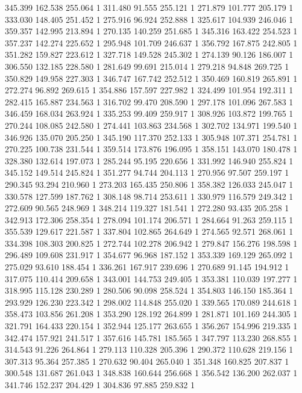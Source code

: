 	345.399	162.538	255.064	1
	311.480	91.555	255.121	1
	271.879	101.777	205.179	1
	333.030	148.405	251.452	1
	275.916	96.924	252.888	1
	325.617	104.939	246.046	1
	359.357	142.995	213.894	1
	270.135	140.259	251.685	1
	345.316	163.422	254.523	1
	357.237	142.274	225.652	1
	295.948	101.709	246.637	1
	356.792	167.875	242.805	1
	351.282	159.827	223.612	1
	327.718	149.528	245.302	1
	274.139	90.126	186.007	1
	306.550	132.185	228.580	1
	281.649	99.691	215.014	1
	279.218	94.848	269.725	1
	350.829	149.958	227.303	1
	346.747	167.742	252.512	1
	350.469	160.819	265.891	1
	272.274	96.892	269.615	1
	354.886	157.597	227.982	1
	324.499	101.954	192.311	1
	282.415	165.887	234.563	1
	316.702	99.470	208.590	1
	297.178	101.096	267.583	1
	346.459	168.034	263.924	1
	335.253	99.409	259.917	1
	308.926	103.872	199.765	1
	270.244	108.085	242.580	1
	274.441	103.863	234.568	1
	302.702	134.971	199.540	1
	346.926	135.070	205.250	1
	345.190	117.370	252.133	1
	305.948	107.371	254.781	1
	270.225	100.738	231.544	1
	359.514	173.876	196.095	1
	358.151	143.070	180.478	1
	328.380	132.614	197.073	1
	285.244	95.195	220.656	1
	331.992	146.940	255.824	1
	345.152	149.514	245.824	1
	351.277	94.744	204.113	1
	270.956	97.507	259.197	1
	290.345	93.294	210.960	1
	273.203	165.435	250.806	1
	358.382	126.033	245.047	1
	330.578	127.599	187.762	1
	308.148	98.714	253.611	1
	330.979	116.579	249.342	1
	272.609	90.565	248.969	1
	348.214	119.327	181.541	1
	272.280	93.435	205.258	1
	342.913	172.306	258.354	1
	278.094	101.174	206.571	1
	284.664	91.263	259.115	1
	355.539	129.617	221.587	1
	337.804	102.865	264.649	1
	274.565	92.571	268.061	1
	334.398	108.303	200.825	1
	272.744	102.278	206.942	1
	279.847	156.276	198.598	1
	296.489	109.608	231.917	1
	354.677	96.968	187.152	1
	353.339	169.129	265.092	1
	275.029	93.610	188.454	1
	336.261	167.917	239.696	1
	270.689	91.145	194.912	1
	317.075	110.414	209.658	1
	343.001	144.753	249.405	1
	353.381	110.039	197.277	1
	318.995	115.128	230.289	1
	280.506	90.098	258.524	1
	354.803	146.150	185.364	1
	293.929	126.230	223.342	1
	298.002	114.848	255.020	1
	339.565	170.089	244.618	1
	358.473	103.856	261.208	1
	353.290	128.192	264.899	1
	281.871	101.169	244.305	1
	321.791	164.433	220.154	1
	352.944	125.177	263.655	1
	356.267	154.996	219.335	1
	342.474	157.921	241.517	1
	357.616	145.781	185.565	1
	347.797	113.230	268.855	1
	314.543	91.226	264.864	1
	279.113	110.328	205.396	1
	290.372	110.628	219.156	1
	307.313	95.364	257.385	1
	270.632	90.404	265.040	1
	351.348	160.825	207.837	1
	300.548	131.687	261.043	1
	348.838	160.644	256.668	1
	356.542	136.200	262.037	1
	341.746	152.237	204.429	1
	304.836	97.885	259.832	1
